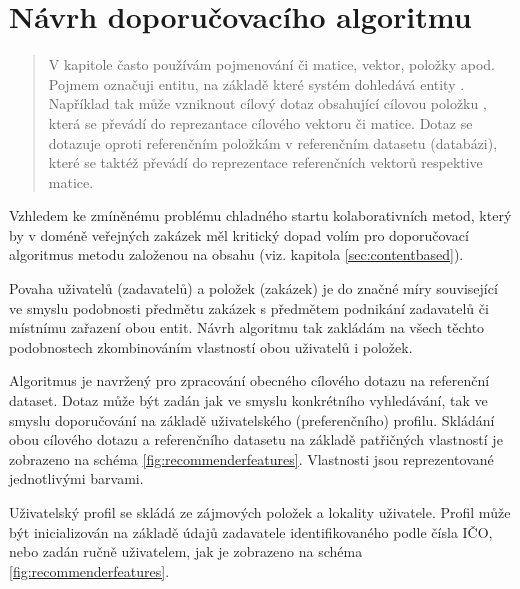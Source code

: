 \documentclass[thesis=M,czech]{FITthesis}[2019/12/23]
\begin{document}
\section{Návrh doporučovacího algoritmu}
\label{sec:recommender_design}

\begin{quote}
    V kapitole často používám pojmenování  či  matice, vektor, položky apod. Pojmem  označuji entitu, na základě které systém dohledává entity . Například tak může vzniknout cílový dotaz obsahující cílovou položku , která se převádí do reprezantace cílového vektoru či matice. Dotaz se dotazuje oproti referenčním položkám v referenčním datasetu (databázi), které se taktéž převádí do reprezentace referenčních vektorů respektive matice.
\end{quote}

Vzhledem ke zmíněnému problému chladného startu kolaborativních metod, který by v doméně veřejných zakázek měl kritický dopad volím pro doporučovací algoritmus metodu založenou na obsahu (viz. kapitola \ref{sec:contentbased}).

Povaha uživatelů (zadavatelů) a položek (zakázek) je do značné míry související ve smyslu podobnosti předmětu zakázek s předmětem podnikání zadavatelů či místnímu zařazení obou entit. Návrh algoritmu tak zakládám na všech těchto podobnostech zkombinováním vlastností obou uživatelů i položek.

Algoritmus je navržený pro zpracování obecného cílového dotazu na referenční dataset. Dotaz může být zadán jak ve smyslu konkrétního vyhledávání, tak ve smyslu doporučování na základě uživatelského (preferenčního) profilu. Skládání obou cílového dotazu a referenčního datasetu na základě patřičných vlastností je zobrazeno na schéma \ref{fig:recommenderfeatures}. Vlastnosti jsou reprezentované jednotlivými barvami.

Uživatelský profil se skládá ze zájmových položek a lokality uživatele. Profil může být inicializován na základě údajů zadavatele identifikovaného podle čísla IČO, nebo zadán ručně uživatelem, jak je zobrazeno na schéma \ref{fig:recommenderfeatures}.
\end{document}

